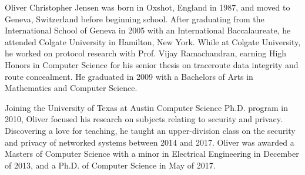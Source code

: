 Oliver Christopher Jensen was born in Oxshot, England in 1987, and moved to Geneva, Switzerland before beginning school.
After graduating from the International School of Geneva in 2005 with an International Baccalaureate,
    he attended Colgate University in Hamilton, New York.
While at Colgate University, he worked on protocol research with Prof. Vijay Ramachandran,
    earning High Honors in Computer Science for his senior thesis on traceroute data integrity and route concealment.
He graduated in 2009 with a Bachelors of Arts in Mathematics and Computer Science.

Joining the University of Texas at Austin Computer Science Ph.D. program in 2010,
    Oliver focused his research on subjects relating to security and privacy.
Discovering a love for teaching, he taught an upper-division class on the security and privacy of networked systems between 2014 and 2017.
Oliver was awarded a Masters of Computer Science with a minor in Electrical Engineering in December of 2013,
    and a Ph.D. of Computer Science in May of 2017.